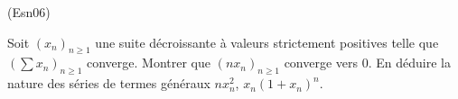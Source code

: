 \begin{tiny}(Esn06)\end{tiny} Soit $\left( x_n\right)_{n\geq 1}$ une suite décroissante à valeurs strictement positives telle que $\left( \sum x_n \right)_{n \geq 1}$ converge.\newline
Montrer que $\left( nx_n\right)_{n\geq 1}$ converge vers $0$. En déduire la nature des séries de termes généraux $nx_n^2$, $x_n(1+x_n)^n$.
